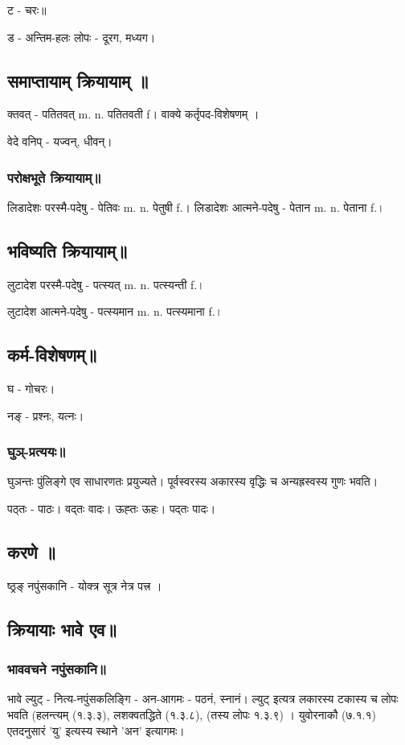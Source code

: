 \documentclass[oneside, article]{memoir}
\begin{document}
ट - चरः॥

ड - अन्तिम-हलः लोपः - दूरग, मध्यग।

\subsection{समाप्तायाम् क्रियायाम् ॥}
क्तवत् - पतितवत् m. n. पतितवती f। वाक्ये कर्तृपद-विशेषणम् ।

वेदे वनिप् - यज्वन्, धीवन्।

 \subsubsection{परोक्षभूते क्रियायाम्॥}
लिडादेशः परस्मै-पदेषु - पेतिवः m. n. पेतुषी f.। लिडादेशः आत्मने-पदेषु - पेतान m. n. पेताना f.।

\subsection{भविष्यति क्रियायाम्॥}
लुटादेश परस्मै-पदेषु - पत्स्यत् m. n. पत्स्यन्ती f.।

लुटादेश आत्मने-पदेषु - पत्स्यमान m. n. पत्स्यमाना f.।

\subsection{कर्म-विशेषणम्॥}
घ - गोचरः।

नङ् - प्रश्नः, यत्नः।


\subsubsection{घुञ्-प्रत्ययः॥}
घुञन्तः पुंलिङ्गे एव साधारणतः प्रयुज्यते। पूर्वस्वरस्य अकारस्य वृद्धिः च  अन्यह्रस्वस्य गुणः भवति।

पठ्तः - पाठः। वद्तः वादः। ऊह्तः ऊहः। पद्तः पादः।

\subsection{करणे ॥}
ष्ठ्रङ् नपुंसकानि - योक्त्र सूत्र नेत्र पत्त्र ।

\subsection{क्रियायाः भावे एव॥}
\subsubsection{भाववचने नपुंसकानि॥}
भावे ल्युट् - नित्य-नपुंसकलिङ्गि - अन-आगमः - पठनं, स्नानं। ल्युट् इत्यत्र लकारस्य टकास्य च लोपः भवति (हलन्त्यम् (१.३.३), लशक्वतद्धिते (१.३.८), (तस्य लोपः १.३.९) । युवोरनाकौ (७.१.१) एतदनुसारं ’यु’ इत्यस्य स्थाने ’अन’ इत्यागमः।
\end{document}
